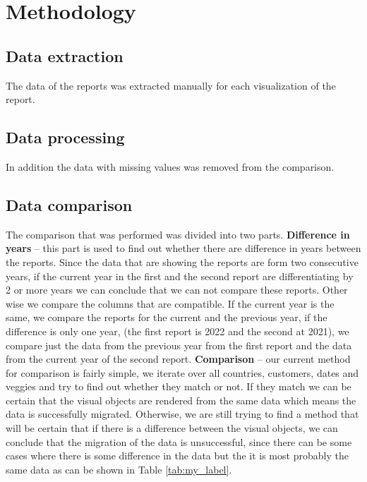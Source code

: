 \documentclass[fleqn,moreauthors,10pt]{ds_report}
\begin{document}
\section*{Methodology}
\subsection*{Data extraction}
The data of the reports was extracted manually for each visualization of the report.
\subsection*{Data processing}
In addition the data with missing values was removed from the comparison.
\subsection*{Data comparison}
The comparison that was performed was divided into two parts. \textbf{Difference in years} -- this part is used to find out whether there are difference in years between the reports. Since the data that are showing the reports are form two consecutive years, if the current year in the first and the second report are differentiating by 2 or more years we can conclude that we can not compare these reports. Other wise we compare the columns that are compatible. If the current year is the same, we compare the reports for the current and the previous year, if the difference is only one year, (the first report is 2022 and the second at 2021), we compare just the data from the previous year from the first report and the data from the current year of the second report. \textbf{Comparison} -- our current method for comparison is fairly simple, we iterate over all countries, customers, dates and veggies and try to find out whether they match or not. If they match we can be certain that the visual objects are rendered from the same data which means the data is successfully migrated. Otherwise, we are still trying to find a method that will be certain that if there is a difference between the visual objects, we can conclude that the migration of the data is unsuccessful, since there can be some cases where there is some difference in the data but the it is most probably the same data as can be shown in Table \ref{tab:my_label}.




\end{document}
